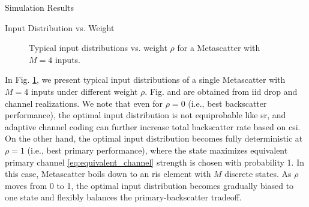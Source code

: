 \documentclass[journal]{IEEEtran}
\begin{document}
\begin{section}{Simulation Results}
	\begin{subsection}{Input Distribution vs. Weight}
		\begin{figure}[!t]
			\centering
			\caption{Typical input distributions vs. weight $\rho$ for a Metascatter with $M=4$ inputs.}
			\label{fi:distribution_weights}
		\end{figure}
		In Fig. \ref{fi:distribution_weights}, we present typical input distributions of a single Metascatter with $M=4$ inputs under different weight $\rho$.
		Fig.  and  are obtained from \gls{iid} drop and channel realizations.
		We note that even for $\rho=0$ (i.e., best backscatter performance), the optimal input distribution is not equiprobable like \gls{sr}, and adaptive channel coding can further increase total backscatter rate based on \gls{csi}.
		On the other hand, the optimal input distribution becomes fully deterministic at $\rho=1$ (i.e., best primary performance), where the state maximizes equivalent primary channel \eqref{eq:equivalent_channel} strength is chosen with probability \num{1}.
		In this case, Metascatter boils down to an \gls{ris} element with $M$ discrete states.
		As $\rho$ moves from \num{0} to \num{1}, the optimal input distribution becomes gradually biased to one state and flexibly balances the primary-backscatter tradeoff.
	\end{subsection}


\end{section}
\end{document}

